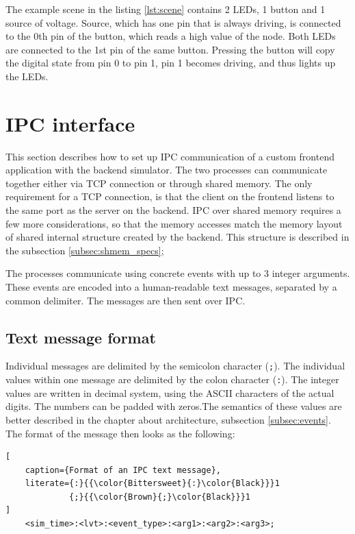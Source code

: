 The example scene in the listing \ref{lst:scene} contains 2 LEDs, 1 button and 1 source of voltage. Source, which has one pin that is always driving, is connected to the 0th pin of the button, which reads a high value of the node. Both LEDs are connected to the 1st pin of the same button. Pressing the button will copy the digital state from pin 0 to pin 1, pin 1 becomes driving, and thus lights up the LEDs.

\section{IPC interface} \label{sec:ipc_spec}
This section describes how to set up IPC communication of a custom frontend application with the backend simulator. The two processes can communicate together either via TCP connection or through shared memory. The only requirement for a TCP connection, is that the client on the frontend listens to the same port as the server on the backend. IPC over shared memory requires a few more considerations, so that the memory accesses match the memory layout of shared internal structure created by the backend. This structure is described in the subsection \ref{subsec:shmem_specs};

The processes communicate using concrete events with up to 3 integer arguments. These events are encoded into a human-readable text messages, separated by a common delimiter. The messages are then sent over IPC.

\subsection{Text message format} \label{sec:msg_format}
Individual messages are delimited by the semicolon character (\texttt{;}). The individual values within one message are delimited by the colon character (\texttt{:}). The integer values are written in decimal system, using the ASCII characters of the actual digits. The numbers can be padded with zeros.\footnotemark The semantics of these values are better described in the chapter about architecture, subsection \ref{subsec:events}. The format of the message then looks as the following:

\begin{lstlisting}[
    caption={Format of an IPC text message},
    literate={:}{{\color{Bittersweet}{:}\color{Black}}}1
             {;}{{\color{Brown}{;}\color{Black}}}1
]
    <sim_time>:<lvt>:<event_type>:<arg1>:<arg2>:<arg3>;
\end{lstlisting}

